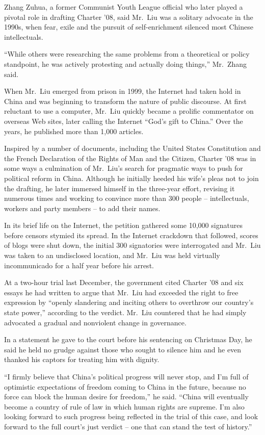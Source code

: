 ﻿\documentclass[12pt]{article}
\begin{document}
Zhang Zuhua, a former Communist Youth League official who later played a pivotal role in drafting
Charter '08, said Mr.~Liu was a solitary advocate in the 1990s, when fear, exile and the pursuit of
self-enrichment silenced most Chinese intellectuals.

``While others were researching the same problems from a theoretical or policy standpoint, he was
actively protesting and actually doing things,'' Mr.~Zhang said.

When Mr.~Liu emerged from prison in 1999, the Internet had taken hold in China and was beginning to
transform the nature of public discourse. At first reluctant to use a computer, Mr.~Liu quickly
became a prolific commentator on overseas Web sites, later calling the Internet ``God's gift to
China.'' Over the years, he published more than 1,000 articles.

Inspired by a number of documents, including the United States Constitution and the French
Declaration of the Rights of Man and the Citizen, Charter '08 was in some ways a culmination of
Mr.~Liu's search for pragmatic ways to push for political reform in China. Although he initially
heeded his wife's pleas not to join the drafting, he later immersed himself in the three-year
effort, revising it numerous times and working to convince more than 300 people -- intellectuals,
workers and party members -- to add their names.

In its brief life on the Internet, the petition gathered some 10,000 signatures before censors
stymied its spread. In the Internet crackdown that followed, scores of blogs were shut down, the
initial 300 signatories were interrogated and Mr.~Liu was taken to an undisclosed location, and
Mr.~Liu was held virtually incommunicado for a half year before his arrest.

At a two-hour trial last December, the government cited Charter '08 and six essays he had written to
argue that Mr.~Liu had exceeded the right to free expression by ``openly slandering and inciting
others to overthrow our country's state power,'' according to the verdict. Mr.~Liu countered that he
had simply advocated a gradual and nonviolent change in governance.

In a statement he gave to the court before his sentencing on Christmas Day, he said he held no
grudge against those who sought to silence him and he even thanked his captors for treating him with
dignity.

``I firmly believe that China's political progress will never stop, and I'm full of optimistic
expectations of freedom coming to China in the future, because no force can block the human desire
for freedom,'' he said. ``China will eventually become a country of rule of law in which human
rights are supreme. I'm also looking forward to such progress being reflected in the trial of this
case, and look forward to the full court's just verdict -- one that can stand the test of history.''
\end{document}
